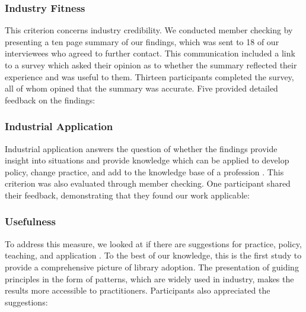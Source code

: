 \subsubsection{Industry Fitness}
This criterion concerns industry credibility. We conducted member checking \cite{creswell2016qualitative} by presenting a ten page summary of our findings, which was sent to 18 of our interviewees who agreed to further contact. This communication included a link to a survey which asked their opinion as to whether the summary reflected their experience and was useful to them. Thirteen participants completed the survey, all of whom opined that the summary was accurate. Five provided detailed feedback on the findings:

\subsubsection{Industrial Application} Industrial application answers the question of whether the findings provide insight into situations and provide knowledge which can be applied to develop policy, change practice, and add to the knowledge base of a profession \cite{corbin2014gt}. This criterion was also evaluated through member checking. One participant shared their feedback, demonstrating that they found our work applicable: 

\subsubsection{Usefulness} To address this measure, we looked at if there are suggestions for practice, policy, teaching, and application \cite{corbin2014gt}. To the best of our knowledge, this is the first study to provide a comprehensive picture of library adoption. The presentation of guiding principles in the form of patterns, which are widely used in industry, makes the results more accessible to practitioners. Participants also appreciated the suggestions:

